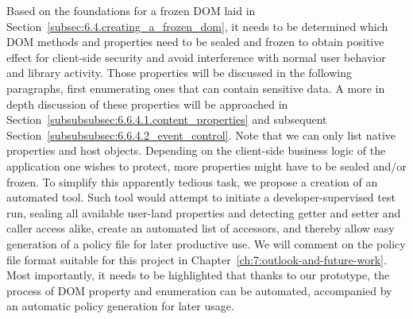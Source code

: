       Based on the foundations for a frozen DOM laid in Section~\ref{subsec:6.4.creating_a_frozen_dom}, it needs to be determined which DOM methods and properties need to be sealed and frozen to obtain positive effect for client-side security and avoid interference with normal user behavior and library activity. Those properties will be discussed in the following paragraphs, first enumerating ones that can contain sensitive data. A more in depth discussion of these properties will be approached in Section~\ref{subsubsubsec:6.6.4.1.content_properties} and subsequent Section~\ref{subsubsubsec:6.6.4.2_event_control}. Note that we can only list native properties and host objects. Depending on the client-side business logic of the application one wishes to protect, more properties might have to be sealed and/or frozen. To simplify this apparently tedious task, we propose a creation of an automated tool. Such tool would attempt to initiate a developer-supervised test run, sealing all available user-land properties and detecting getter and setter and caller access alike, create an automated list of accessors, and thereby allow easy generation of a policy file for later productive use. We will comment on the policy file format suitable for this project in Chapter~\ref{ch:7:outlook-and-future-work}. Most importantly, it needs to be highlighted that thanks to our prototype, the process of DOM property and enumeration can be automated, accompanied by an automatic policy generation for later usage.
  
% 
% 
% 


